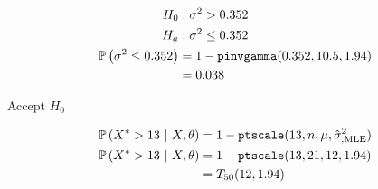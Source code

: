 \documentclass[12pt]{article}
\begin{document}
\begin{enumerate}
\begin{align*}
    H_{0} &: \sigma^2 > 0.352 \\ 
    H_{a} &: \sigma^2 \leq 0.352 \\
    \mathbb{P}\left(\sigma^2 \leq 0.352\right) &= 1 - \texttt{pinvgamma}(0.352, 10.5, 1.94) \\ 
    &= 0.038
\end{align*} 

Accept $H_{0}$


\begin{align*}
    \mathbb{P}\left(X^{*} > 13 ~|~ X, \theta\right) &= 1 - \texttt{ptscale}(13, n, \mu, \hat{\sigma}^2_{, \text{MLE}}) \\  
    \mathbb{P}\left(X^{*} > 13 ~|~ X, \theta\right) &= 1 - \texttt{ptscale}(13, 21, 12, 1.94) \\ 
    &= T_{50}(12, 1.94)
\end{align*}

\end{enumerate}
\end{document}
